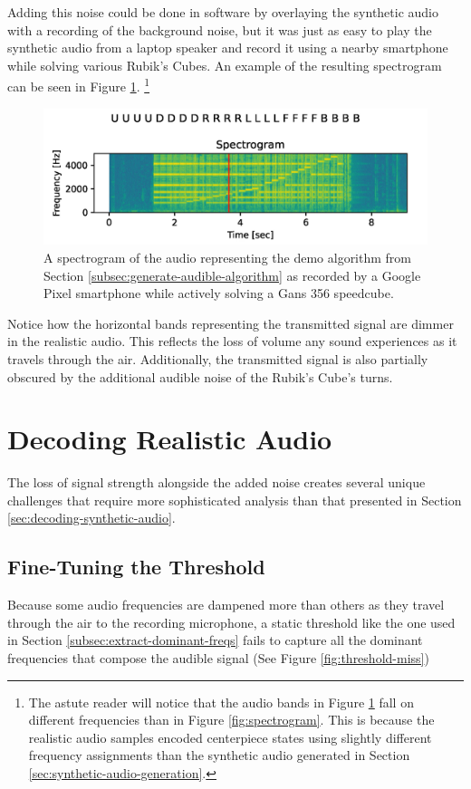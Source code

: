 Adding this noise could be done in software by overlaying the synthetic audio with a recording of the background noise, but it was just as easy to play the synthetic audio from a laptop speaker and record it using a nearby smartphone while solving various Rubik's Cubes.
An example of the resulting spectrogram can be seen in Figure \ref{fig:noisy-spectrogram}.
\footnote{The astute reader will notice that the audio bands in Figure \ref{fig:noisy-spectrogram} fall on different frequencies than in Figure \ref{fig:spectrogram}. This is because the realistic audio samples encoded centerpiece states using slightly different frequency assignments than the synthetic audio generated in Section \ref{sec:synthetic-audio-generation}.}

\begin{figure}[h]
    \centering
    \includegraphics[width=0.8\linewidth]{Figures/5 Algorithm Design/transmitted-356-5tps.png}
    \caption{A spectrogram of the audio representing the demo algorithm from Section \ref{subsec:generate-audible-algorithm} as recorded by a Google Pixel smartphone while actively solving a Gans 356 speedcube.}
    \label{fig:noisy-spectrogram}
\end{figure}

Notice how the horizontal bands representing the transmitted signal are dimmer in the realistic audio.
This reflects the loss of volume any sound experiences as it travels through the air.
Additionally, the transmitted signal is also partially obscured by the additional audible noise of the Rubik's Cube's turns.

\section{Decoding Realistic Audio}
\label{sec:decoding-realistic-noise}
The loss of signal strength alongside the added noise creates several unique challenges that require more sophisticated analysis than that presented in Section \ref{sec:decoding-synthetic-audio}.

\subsection{Fine-Tuning the Threshold}
\label{subsec:fine-tuning-threshold}
Because some audio frequencies are dampened more than others as they travel through the air to the recording microphone, a static threshold like the one used in Section \ref{subsec:extract-dominant-freqs} fails to capture all the dominant frequencies that compose the audible signal (See Figure \ref{fig:threshold-miss})

